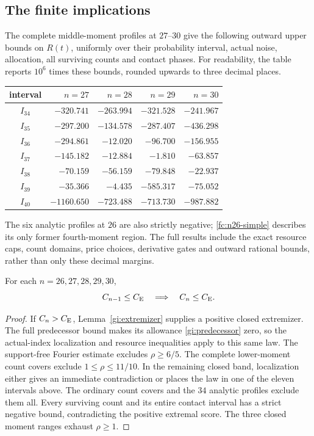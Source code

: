 \subsection{The finite implications}


The complete middle-moment profiles at $27$--$30$ give the following outward
upper bounds on $R(t)$, uniformly over their probability interval,
actual noise, allocation, all surviving counts and contact phases.
For readability, the table reports $10^6$ times these bounds,
rounded upwards to three decimal places.
\begin{center}
\begin{tabular}{crrrr}
\toprule
interval & $n=27$ & $n=28$ & $n=29$ & $n=30$\\
\midrule
$I_{34}$ & $-320.741$ & $-263.994$ & $-321.528$ & $-241.967$\\
$I_{35}$ & $-297.200$ & $-134.578$ & $-287.407$ & $-436.298$\\
$I_{36}$ & $-294.861$ & $-12.020$  & $-96.700$  & $-156.955$\\
$I_{37}$ & $-145.182$ & $-12.884$  & $-1.810$   & $-63.857$\\
$I_{38}$ & $-70.159$  & $-56.159$  & $-79.848$  & $-22.937$\\
$I_{39}$ & $-35.366$  & $-4.435$   & $-585.317$ & $-75.052$\\
$I_{40}$ & $-1160.650$& $-723.488$ & $-713.730$ & $-987.882$\\
\bottomrule
\end{tabular}
\end{center}
The six analytic profiles at $26$ are also strictly negative;
\eqref{fc:n26-simple} describes its only former fourth-moment
region. The full results include the exact resource caps, count
domains, price choices, derivative gates and outward rational
bounds, rather than only these decimal margins.

\begin{proposition}\label{fc:five}
For each $n=26,27,28,29,30$,
\[
 C_{n-1}\le C_{\mathrm E}\quad\Longrightarrow\quad C_n\le C_{\mathrm E}.
\]
\end{proposition}
\begin{proof}
If $C_n>C_{\mathrm E}$, Lemma~\ref{gi:extremizer} supplies a positive
closed extremizer. The full predecessor bound makes its
allowance \eqref{gi:predecessor} zero, so the actual-index
localization and resource inequalities apply to this same law.
The support-free Fourier estimate excludes $\rho\ge6/5$.
The complete lower-moment count covers exclude
$1\le\rho\le11/10$.
In the remaining closed band, localization either gives an
immediate contradiction or places the law in one of the eleven
intervals above. The ordinary count covers and the $34$ analytic
profiles exclude them all. Every surviving count and its entire
contact interval has a strict negative bound, contradicting the
positive extremal score. The three closed moment ranges exhaust
$\rho\ge1$.
\end{proof}

